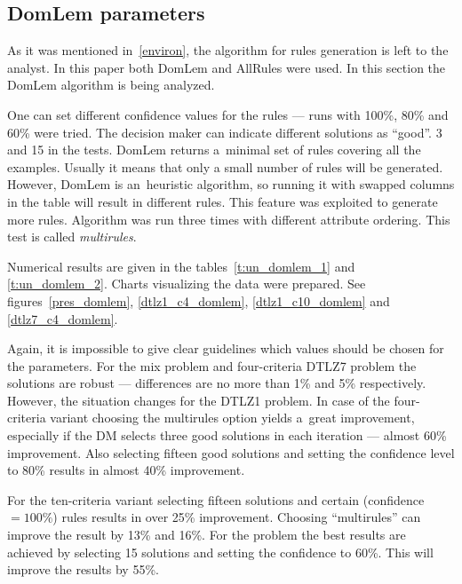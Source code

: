 \clearpage{}
\subsection{DomLem parameters}
\label{domlem-par}

As it was mentioned in~\ref{environ}, the algorithm for rules generation is left to
the analyst. In this paper both DomLem and AllRules were used. In this section
the DomLem algorithm is being analyzed.

One can set different confidence values for the rules --- runs with 100\%,
80\% and 60\% were tried. The decision maker can indicate different solutions
as ``good''.  3 and 15 in the tests. DomLem returns a~minimal set of rules
covering all the examples. Usually it means that only a small number of rules
will be generated. However, DomLem is an~heuristic algorithm, so running it
with swapped columns in the table will result in different rules. This feature
was exploited to generate more rules. Algorithm was run three times with
different attribute ordering. This test is called \textit{multirules}.

Numerical results are given in the tables~\ref{t:un_domlem_1} and
\ref{t:un_domlem_2}. Charts visualizing the data were prepared. See
figures~\ref{pres_domlem}, \ref{dtlz1_c4_domlem}, \ref{dtlz1_c10_domlem} and
\ref{dtlz7_c4_domlem}.

Again, it is impossible to give clear guidelines which values should be chosen
for the parameters. For the mix problem and four-criteria DTLZ7 problem the
solutions are robust --- differences are no more than 1\% and 5\%
respectively. However, the situation changes for the DTLZ1 problem. In case of
the four-criteria variant choosing the multirules option yields a~great
improvement, especially if the DM selects three good solutions in each
iteration --- almost 60\% improvement. Also selecting fifteen good solutions
and setting the confidence level to 80\% results in almost 40\% improvement.

For the ten-criteria variant selecting fifteen solutions and certain
(confidence $= 100\%$) rules results in over 25\% improvement. Choosing
``multirules'' can improve the result by 13\% and 16\%. For the problem the
best results are achieved by selecting 15 solutions and setting the confidence
to 60\%. This will improve the results by 55\%.

